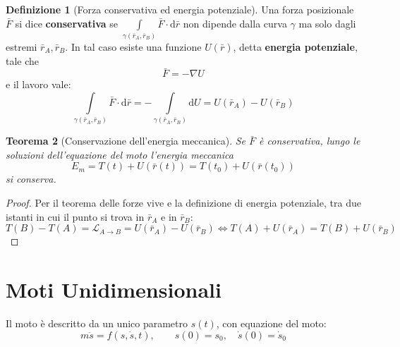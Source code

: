 \documentclass[11pt, a4paper, openright]{book}
\theoremstyle{plain}
\newtheorem{teorema}{Teorema}[section]
\theoremstyle{definition}
\newtheorem{definizione}[teorema]{Definizione}
\theoremstyle{remark}
\begin{document}
\begin{definizione}[Forza conservativa ed energia potenziale]
    Una forza posizionale $\bar{F}$ si dice \textbf{conservativa} se $\int\limits_{\gamma(\bar{r}_A, \bar{r}_B)} \bar{F} \cdot \mathrm{d}\bar{r}$ non dipende dalla curva $\gamma$ ma solo dagli estremi $\bar{r}_A, \bar{r}_B$. In tal caso esiste una funzione $U(\bar{r})$, detta \textbf{energia potenziale}, tale che
    \begin{equation}
        \bar{F} = -\nabla U
    \end{equation}
    e il lavoro vale:
    \begin{equation}
        \int\limits_{\gamma(\bar{r}_A, \bar{r}_B)} \bar{F} \cdot \mathrm{d}\bar{r} = -\int\limits_{\gamma(\bar{r}_A, \bar{r}_B)} \mathrm{d}U = U(\bar{r}_A) - U(\bar{r}_B)
    \end{equation}
\end{definizione}

\begin{teorema}[Conservazione dell'energia meccanica]
    Se $\bar{F}$ è conservativa, lungo le soluzioni dell'equazione del moto l'energia meccanica
    \begin{equation}
        E_m = T(t) + U(\bar{r}(t)) = T(t_0) + U(\bar{r}(t_0))
    \end{equation}
    si conserva.
\end{teorema}
\begin{proof}
    Per il teorema delle forze vive e la definizione di energia potenziale, tra due istanti in cui il punto si trova in $\bar{r}_A$ e in $\bar{r}_B$:
    \begin{equation}
        T(B) - T(A) = \mathcal{L}_{A \to B} = U(\bar{r}_A) - U(\bar{r}_B) \iff T(A) + U(\bar{r}_A) = T(B) + U(\bar{r}_B)
    \end{equation}
\end{proof}

\chapter{Moti Unidimensionali}

Il moto è descritto da un unico parametro $s(t)$, con equazione del moto:
\begin{equation}
    m\ddot{s} = f(s, \dot{s}, t), \qquad s(0) = s_0, \quad \dot{s}(0) = \dot{s}_0
\end{equation}
\end{document}
